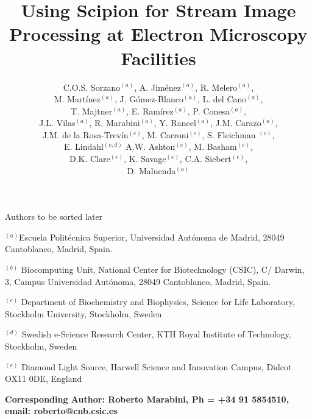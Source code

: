 \documentclass[12pt]{article}
\newcommand{\lyxaddress}[1]{
   \par {\raggedright #1
   \vspace{1.4em}
   \noindent\par}
}
\begin{document}
\title{Using Scipion for Stream Image Processing at Electron Microscopy Facilities}
Authors to be sorted later
\author{C.O.S. Sorzano$^{(a)}$,
A. Jim\'{e}nez$^{(a)}$,
R. Melero$^{(a)}$,\\
M. Mart\'{i}nez$^{(a)}$,
J. G\'{o}mez-Blanco$^{(a)}$,
L. del Cano$^{(a)}$,\\
T. Majtner$^{(a)}$,
E. Ram\'{i}rez$^{(a)}$,
P. Conesa$^{(a)}$,\\
J.L. Vilas$^{(a)}$,
R. Marabini$^{(a)}$,
Y. Rancel$^{(a)}$,
J.M. Carazo$^{(a)}$,\\
J.M. de la Rosa-Trev\'{i}n$^{(c)}$,
M. Carroni$^{(c)}$,
S. Fleichman $^{(c)}$,\\
E. Lindahl$^{(c,d)}$
A.W. Ashton$^{(e)}$,
M. Basham$^{(e)}$,\\
D.K. Clare$^{(e)}$,
K. Savage$^{(e)}$,
C.A. Siebert$^{(e)}$,\\
D. Maluenda$^{(a)}$
        }

\maketitle

\lyxaddress{{\small \vspace{-0.5cm}$^{(a)}$Escuela Polit\'{e}cnica Superior, Universidad Aut\'{o}noma de Madrid, 28049 Cantoblanco, Madrid, Spain.}}
\lyxaddress{{\small$^{(b)}$ Biocomputing Unit, National Center for Biotechnology (CSIC), C/ Darwin, 3, Campus Universidad Aut\'{o}noma, 28049 Cantoblanco, Madrid, Spain.}}
\lyxaddress{{\small$^{(c)}$ Department of Biochemistry and Biophysics, Science for Life Laboratory, Stockholm University, Stockholm, Sweden}} 
\lyxaddress{{\small$^{(d)}$ Swedish e-Science Research Center, KTH Royal Institute of Technology, Stockholm, Sweden}}
\lyxaddress{{\small$^{(e)}$ Diamond Light Source, Harwell Science and Innovation Campus, Didcot OX11 0DE, England}}
\setcounter{figure}{2}%
\textbf{Corresponding Author: Roberto Marabini, Ph = +34 91 5854510, email: roberto@cnb.csic.es\\} %

\newpage







\appendix




\clearpage
%

\newpage
%
%
\end{document}
